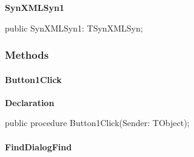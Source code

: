 \documentclass{report}
\newif\ifpdf
\begin{document}
\begin{list}{}
\begin{flushleft}
\ifpdf
\end{flushleft}
\fi


\par  \label{editor.TFrmEditor-SynXMLSyn1}
\item[\textbf{SynXMLSyn1}\hfill]
\ifpdf
\begin{flushleft}
\fi
\begin{ttfamily}
public SynXMLSyn1: TSynXMLSyn;\end{ttfamily}

\ifpdf
\end{flushleft}
\fi


\par  \end{list}
\subsubsection*{\large{\textbf{Methods}}\normalsize\hspace{1ex}\hfill}
\paragraph*{Button1Click}\hspace*{\fill}

\label{editor.TFrmEditor-Button1Click}
\begin{list}{}{
\setlength{\itemindent}{0cm}
\setlength{\listparindent}{0cm}
\setlength{\leftmargin}{\evensidemargin}
\addtolength{\leftmargin}{\tmplength}
\settowidth{\labelsep}{X}
\addtolength{\leftmargin}{\labelsep}
\setlength{\labelwidth}{\tmplength}
}
\item[\textbf{Declaration}\hfill]
\ifpdf
\begin{flushleft}
\fi
\begin{ttfamily}
public procedure Button1Click(Sender: TObject);\end{ttfamily}

\ifpdf
\end{flushleft}
\fi

\end{list}
\paragraph*{FindDialogFind}\hspace*{\fill}
\end{document}
